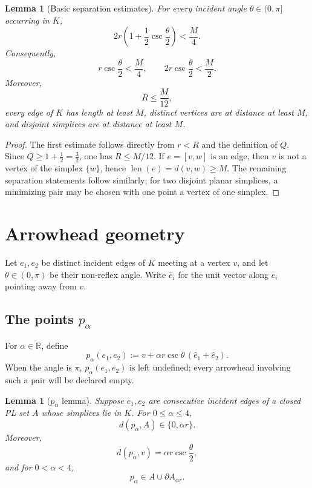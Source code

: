 \documentclass[11pt]{article}
\newtheorem{lemma}[theorem]{Lemma}
\newcommand{\R}{\mathbb R}
\newcommand{\len}{\operatorname{len}}
\numberwithin{equation}{section}
\begin{document}
\begin{lemma}[Basic separation estimates]\label{lem:basic-separation}
For every incident angle $\theta\in(0,\pi]$ occurring in $K$,
\begin{equation}\label{eq:radius-master-bound}
2r\left(1+\frac12\csc\frac\theta2\right)<\frac M4.
\end{equation}
Consequently,
\[
r\csc\frac\theta2<\frac M4,
\qquad
2r\csc\frac\theta2<\frac M2.
\]
Moreover,
\[
R\le\frac{M}{12},
\]
every edge of $K$ has length at least $M$, distinct vertices are at distance at least $M$, and disjoint simplices are at distance at least $M$.
\end{lemma}

\begin{proof}
The first estimate follows directly from $r<R$ and the definition of $Q$. Since $Q\ge 1+\tfrac12=\tfrac32$, one has $R\le M/12$. If $e=[v,w]$ is an edge, then $v$ is not a vertex of the simplex $\{w\}$, hence $\len(e)=d(v,w)\ge M$. The remaining separation statements follow similarly; for two disjoint planar simplices, a minimizing pair may be chosen with one point a vertex of one simplex.
\end{proof}
 \section{Arrowhead geometry}\label{sec:arrowheads}

Let $e_1,e_2$ be distinct incident edges of $K$ meeting at a vertex $v$, and let $\theta\in(0,\pi)$ be their non-reflex angle. Write $\widehat e_i$ for the unit vector along $e_i$ pointing away from $v$.

\subsection{The points \texorpdfstring{$p_\alpha$}{p-alpha}}

For $\alpha\in\R$, define
\begin{equation}\label{eq:palpha-def}
p_\alpha(e_1,e_2)
:=
v+\alpha r\csc\theta\,(\widehat e_1+\widehat e_2).
\end{equation}
When the angle is $\pi$, $p_\alpha(e_1,e_2)$ is left undefined; every arrowhead involving such a pair will be declared empty.

\begin{lemma}[$p_\alpha$ lemma]\label{lem:palpha}
Suppose $e_1,e_2$ are consecutive incident edges of a closed PL set $A$ whose simplices lie in $K$. For $0\le\alpha\le4$,
\[
d(p_\alpha,A)\in\{0,\alpha r\}.
\]
Moreover,
\[
d(p_\alpha,v)=\alpha r\csc\frac\theta2,
\]
and for $0<\alpha<4$,
\[
p_\alpha\in A\cup\partial A_{\alpha r}.
\]
\end{lemma}
\end{document}
